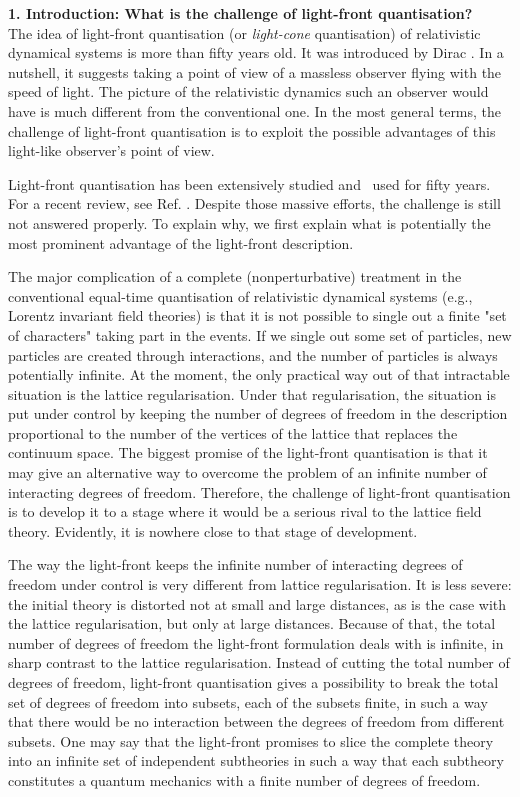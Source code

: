 \documentclass[a4paper,12pt]{article}
\begin{document}
{\bf 1. Introduction: What is the challenge of 
light-front quantisation? }\\

The idea of light-front quantisation (or {\it light-cone} quantisation) 
of  relativistic dynamical systems is more than fifty years old. 
It was introduced by Dirac \cite{Dirac}. In a nutshell, it suggests 
taking a point of view of a massless observer 
flying with the speed of light. 
The picture of the relativistic dynamics such an observer would have 
is much different from the 
conventional one. In the most general terms, the challenge of light-front 
quantisation is to exploit the possible advantages of this  
light-like observer's point of view.

Light-front quantisation has been extensively studied and \
used for fifty years. For a recent review, 
see Ref. \cite{Brodsky}.
Despite those massive efforts, the challenge is still not 
answered properly. To explain why, we first explain what is 
potentially the most prominent advantage 
of the light-front description.

The major complication of a complete (nonperturbative) treatment in the 
conventional equal-time quantisation of 
relativistic dynamical systems (e.g., Lorentz invariant field theories) 
is that it is not possible to single out a finite "set of characters" taking 
part in the events. If we single out some set of particles, 
new particles are created through interactions, and 
the number of particles is always potentially infinite.
At the moment, the only practical way out of that intractable 
situation is the lattice regularisation. 
Under that regularisation, the situation is put under control by 
keeping the number of degrees of freedom in the description 
proportional to the 
number of the vertices of the lattice that replaces
the continuum space. The biggest promise of the light-front 
quantisation is that it 
may give an alternative way to overcome the problem of 
an infinite number of 
interacting degrees of freedom. Therefore, the challenge of 
light-front quantisation is to develop it to a stage where 
it would be a serious rival to the lattice field theory. 
Evidently, it is nowhere close to that stage of
development.

The way the light-front keeps the infinite 
number of interacting 
degrees of freedom under control is very different from lattice 
regularisation. It is less severe: the initial theory 
is distorted
not at small and large distances, as is the case with 
the lattice regularisation, 
but only at large distances. Because of that, the total 
number of degrees of freedom
the light-front formulation deals with is infinite, in sharp contrast to the
lattice regularisation. Instead of cutting the total number of degrees of 
freedom, light-front quantisation gives a possibility to break the total 
set of degrees of freedom into 
subsets, each of the 
subsets finite, in such a way that
there would be no interaction between the degrees of freedom from different 
subsets. One may say that the light-front promises to slice 
the complete theory into an
infinite set of independent subtheories in such a way that 
each subtheory constitutes 
a quantum mechanics with a finite number of degrees of freedom.
\end{document}
